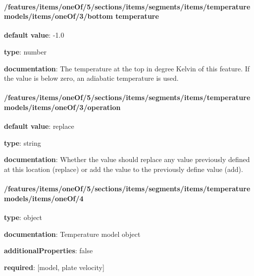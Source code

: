 \begin{itemized}
\end{itemized}\paragraph{/features/items/oneOf/5/sections/items/segments/items/temperature models/items/oneOf/3/bottom temperature} \begin{itemized}
\item {\bf default value}: -1.0
\item {\bf type}: number
\item {\bf documentation}: The temperature at the top in degree Kelvin of this feature. If the value is below zero, an adiabatic temperature is used.
\end{itemized}\paragraph{/features/items/oneOf/5/sections/items/segments/items/temperature models/items/oneOf/3/operation} \begin{itemized}
\item {\bf default value}: replace
\item {\bf type}: string
\item {\bf documentation}: Whether the value should replace any value previously defined at this location (replace) or add the value to the previously define value (add).
\end{itemized}\paragraph{/features/items/oneOf/5/sections/items/segments/items/temperature models/items/oneOf/4} \begin{itemized}
\item {\bf type}: object
\item {\bf documentation}: Temperature model object
\item {\bf additionalProperties}: false
\item {\bf required}: [model, plate velocity]\end{itemized}
